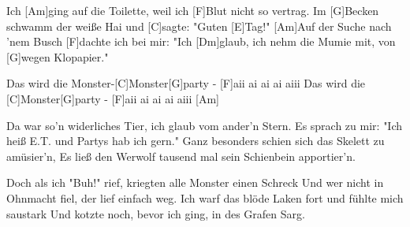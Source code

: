 \begin{guitar}
	Ich [Am]ging auf die Toilette, weil ich [F]Blut nicht so vertrag.
	Im [G]Becken schwamm der weiße Hai und [C]sagte: "Guten [E]Tag!"
	[Am]Auf der Suche nach 'nem Busch [F]dachte ich bei mir:
	"Ich [Dm]glaub, ich nehm die Mumie mit, von [G]wegen Klopapier."
	
	\begin{highlightbar}
		Das wird die Monster-[C]Monster[G]party - [F]aii ai ai ai aiii
		Das wird die [C]Monster[G]party - [F]aii ai ai ai aiii [Am]{}
	\end{highlightbar}
	
	\songsection{Strophe 4}
	Da war so'n widerliches Tier, ich glaub vom ander'n Stern.
	Es sprach zu mir: "Ich heiß E.T. und Partys hab ich gern."
	Ganz besonders schien sich das Skelett zu amüsier'n,
	Es ließ den Werwolf tausend mal sein Schienbein apportier'n.
	
	Doch als ich "Buh!" rief, kriegten alle Monster einen Schreck
	Und wer nicht in Ohnmacht fiel, der lief einfach weg.
	Ich warf das blöde Laken fort und fühlte mich saustark
	Und kotzte noch, bevor ich ging, in des Grafen Sarg.
	
	\begin{highlightbar}
		  \optionalChord{(x4)}
	\end{highlightbar}
\end{guitar}
